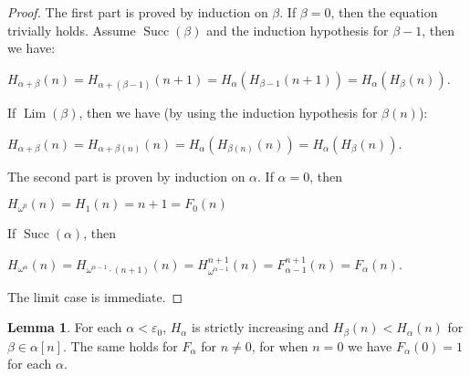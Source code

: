 \documentclass[8pt]{article}
\theoremstyle{definition}
\theoremstyle{definition}
\theoremstyle{definition}
\theoremstyle{definition}
\theoremstyle{definition}
\theoremstyle{definition}
\theoremstyle{definition}
\theoremstyle{definition}
\newtheorem{lemma}{Lemma}[section]
\theoremstyle{definition}
\theoremstyle{definition}
\theoremstyle{definition}
\theoremstyle{definition}
\theoremstyle{definition}
\theoremstyle{question}
\begin{document}
\begin{proof}
  The first part is proved by induction on $\beta$. If $\beta = 0$, then the equation trivially holds.
  Assume $\operatorname{Succ}(\beta)$ and the induction hypothesis for $\beta -1$, then
  we have:
  \begin{center}
    $H_{\alpha + \beta}(n) = H_{\alpha + (\beta - 1)}(n + 1) = H_{\alpha}(H_{\beta - 1}(n + 1)) = H_{\alpha}(H_{\beta}(n))$.
  \end{center}

  If $\operatorname{Lim}(\beta)$, then we have (by using the induction hypothesis for $\beta(n)$):
  \begin{center}
    $H_{\alpha + \beta}(n) = H_{\alpha + \beta(n)}(n) = H_{\alpha}(H_{\beta(n)}(n)) = H_{\alpha}(H_{\beta}(n))$.
  \end{center}

  The second part is proven by induction on $\alpha$. If $\alpha = 0$, then

  \begin{center}
    $H_{\omega^0}(n) = H_1(n) = n + 1 = F_0(n)$
  \end{center}

  If $\operatorname{Succ}(\alpha)$, then

  \begin{center}
    $H_{\omega^{\alpha}}(n) = H_{\omega^{\alpha - 1} \cdot (n + 1)}(n) = H^{n + 1}_{\omega^{\alpha - 1}}(n) = F^{n + 1}_{\alpha - 1}(n) = F_{\alpha}(n)$.
  \end{center}

  The limit case is immediate.
\end{proof}

\begin{lemma}
  For each $\alpha < \varepsilon_0$, $H_{\alpha}$ is strictly increasing and $H_{\beta}(n) < H_{\alpha}(n)$
  for $\beta \in \alpha[n]$. The same holds for $F_{\alpha}$ for $n \neq 0$, for when $n = 0$ we have $F_{\alpha}(0) = 1$
  for each $\alpha$.
\end{lemma}
\end{document}
